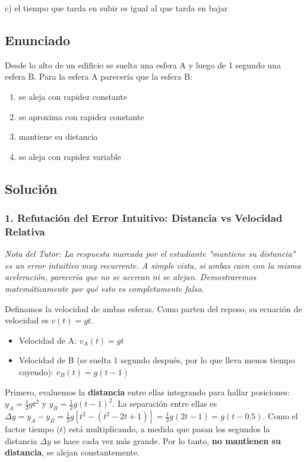 \documentclass[12pt, a4paper]{article}
\begin{document}
\begin{tcolorbox}[colback=green!5!white, colframe=green!50!black, title=Respuesta Final]
\centering \Large c) el tiempo que tarda en subir es igual al que tarda en bajar
\end{tcolorbox}

\newpage

\subsection*{Enunciado}
Desde lo alto de un edificio se suelta una esfera A y luego de 1 segundo una esfera B. Para la esfera A parecería que la esfera B:
\begin{enumerate}[label=\alph*)]
    \item se aleja con rapidez constante
    \item se aproxima con rapidez constante
    \item mantiene su distancia
    \item se aleja con rapidez variable
\end{enumerate}

\subsection*{Solución}

\subsubsection*{1. Refutación del Error Intuitivo: Distancia vs Velocidad Relativa}
\textit{Nota del Tutor: La respuesta marcada por el estudiante "mantiene su distancia" es un error intuitivo muy recurrente. A simple vista, si ambas caen con la misma aceleración, parecería que no se acercan ni se alejan. Demostraremos matemáticamente por qué esto es completamente falso.}

Definamos la velocidad de ambas esferas. Como parten del reposo, su ecuación de velocidad es $v(t) = gt$.
\begin{itemize}
    \item Velocidad de A: $v_A(t) = gt$
    \item Velocidad de B (se suelta 1 segundo después, por lo que lleva menos tiempo cayendo): $v_B(t) = g(t-1)$
\end{itemize}

Primero, evaluemos la \textbf{distancia} entre ellas integrando para hallar posiciones:
$y_A = \frac{1}{2}gt^2$ y $y_B = \frac{1}{2}g(t-1)^2$.
La separación entre ellas es $\Delta y = y_A - y_B = \frac{1}{2}g[t^2 - (t^2 - 2t + 1)] = \frac{1}{2}g(2t - 1) = g(t - 0.5)$.
Como el factor tiempo ($t$) está multiplicando, a medida que pasan los segundos la distancia $\Delta y$ se hace cada vez más grande. Por lo tanto, \textbf{no mantienen su distancia}, se alejan constantemente.
\end{document}
